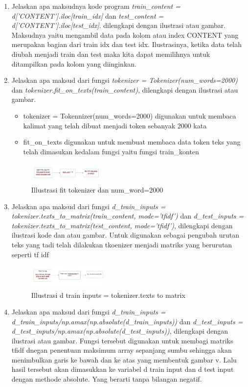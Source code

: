 \begin{enumerate}
	\item Jelaskan apa maksudnya kode program \emph{train\_content = d['CONTENT'].iloc[train\_idx]} dan \emph{test\_content = d['CONTENT'].iloc[test\_idx]}. dilengkapi dengan ilustrasi atau gambar.
	\hfill \break
	Maksudnya yaitu mengambil data pada kolom atau index CONTENT yang merupakan bagian dari train idx dan test idx. Ilustrasinya, ketika data telah diubah menjadi train dan test maka kita dapat memilihnya untuk ditampilkan pada kolom yang diinginkan.

	\item Jelaskan apa maksud dari fungsi \emph{tokenizer = Tokenizer(num\_words=2000)} dan \emph{tokenizer.fit\_on\_texts(train\_content)}, dilengkapi dengan ilustrasi atau gambar.
		\begin{itemize}
			\item tokenizer = Tokennizer(num\_words=2000) digunakan untuk membaca kalimat yang telah dibuat menjadi token sebanyak 2000 kata
    		\item fit\_on\_texts digunakan untuk membuat membaca data token teks yang telah dimasukan kedalam fungsi yaitu fungsi train\_konten
		\end{itemize}
	\begin{figure}[H]
		\includegraphics[width=4cm]{figures/1174087/7/2.png}
		\centering
		\caption{Illustrasi fit tokenizer dan num\_word=2000}
	\end{figure}
	
	\item Jelaskan apa maksud dari fungsi \emph{d\_train\_inputs = tokenizer.texts\_to\_matrix(train\_content, mode='tfidf')} dan \emph{d\_test\_inputs = tokenizer.texts\_to\_matrix(test\_content, mode='tfidf')}, dilengkapi dengan ilustrasi kode dan atau gambar.
	\hfill \break
	Untuk digunakan sebagai pengubah urutan teks yang tadi telah dilakukan tkoenizer menjadi matriks yang berurutan seperti tf idf
	\begin{figure}[H]
		\includegraphics[width=4cm]{figures/1174087/7/3.png}
		\centering
		\caption{Illustrasi d train inputs = tokenizer.texts to matrix}
	\end{figure}
	
	\item Jelaskan apa maksud dari fungsi \emph{d\_train\_inputs = d\_train\_inputs/np.amax(np.absolute(d\_train\_inputs))} dan \emph{d\_test\_inputs = d\_test\_inputs/np.amax(np.absolute(d\_test\_inputs))}, dilengkapi dengan ilustrasi atau gambar.
	\hfill \break
	Fungsi tersebut digunakan untuk membagi matriks tfidf dnegan penentuan maksimum array sepanjang sumbu sehingga akan menimbulkan garis ke bawah dan ke atas yang membentuk gambar v. Lalu hasil tersebut akan dimasukkan ke variabel d train input dan d test input dengan methode absolute. Yang berarti tanpa bilangan negatif.
	

\end{enumerate}
